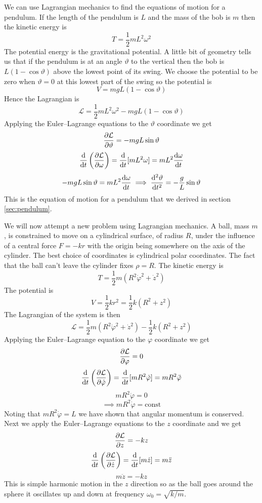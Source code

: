 \documentclass{article}
\newcommand{\LL}{\mathcal{L}}
\begin{document}
    \example
    We can use Lagrangian mechanics to find the equations of motion for a pendulum.
    If the length of the pendulum is \(L\) and the mass of the bob is \(m\) then the kinetic energy is
    \[T = \frac{1}{2}mL^2\omega^2\]
    The potential energy is the gravitational potential.
    A little bit of geometry tells us that if the pendulum is at an angle \(\vartheta\) to the vertical then the bob is \(L(1 - \cos\vartheta)\) above the lowest point of its swing.
    We choose the potential to be zero when \(\vartheta = 0\) at this lowest part of the swing so the potential is
    \[V = mgL(1 - \cos\vartheta)\]
    Hence the Lagrangian is
    \[\LL = \frac{1}{2}mL^2\omega^2 - mgL(1 - \cos\vartheta)\]
    Applying the Euler--Lagrange equations to the \(\vartheta\) coordinate we get
    \[\pdv{\LL}{\vartheta} = -mgL\sin\vartheta\]
    \[\dv{t}\left(\pdv{\LL}{\omega}\right) = \dv{t}[mL^2\omega] = mL^2\dv{\omega}{t}\]
    \[-mgL\sin\vartheta = mL^2\dv{\omega}{t}\implies \dv[2]{\vartheta}{t} = -\frac{g}{L}\sin\vartheta\]
    This is the equation of motion for a pendulum that we derived in section \ref{sec:pendulum}.
    
    \example
    We will now attempt a new problem using Lagrangian mechanics.
    A ball, mass \(m\), is constrained to move on a cylindrical surface, of radius \(R\), under the influence of a central force \(F = -kr\) with the origin being somewhere on the axis of the cylinder.
    The best choice of coordinates is cylindrical polar coordinates.
    The fact that the ball can't leave the cylinder fixes \(\rho = R\).
    The kinetic energy is
    \[T = \frac{1}{2}m(R^2\dot\varphi^2 + \dot z^2)\]
    The potential is
    \[V = \frac{1}{2}kr^2 = \frac{1}{2}k(R^2 + z^2)\]
    The Lagrangian of the system is then
    \[\LL = \frac{1}{2}m(R^2\dot\varphi^2 + \dot z^2) - \frac{1}{2}k(R^2 + z^2)\]
    Applying the Euler--Lagrange equation to the \(\varphi\) coordinate we get
    \[\pdv{\LL}{\varphi} = 0\]
    \[\dv{t}\left(\pdv{\LL}{\dot\varphi}\right) = \dv{t}[mR^2\dot\varphi] = mR^2\ddot\varphi\]
    \[mR^2\ddot\varphi = 0\]
    \[\implies mR^2\dot\varphi = \text{const}\]
    Noting that \(mR^2\dot\varphi = L\) we have shown that angular momentum is conserved.
    Next we apply the Euler--Lagrange equations to the \(z\) coordinate and we get
    \[\pdv{\LL}{z} = -kz\]
    \[\dv{t}\left(\pdv{\LL}{\dot z}\right) = \dv{t}[m\dot z] = m\ddot z\]
    \[m\ddot z = -kz\]
    This is simple harmonic motion in the \(z\) direction so as the ball goes around the sphere it oscillates up and down at frequency \(\omega_0 = \sqrt{k/m}\).
    
\end{document}
